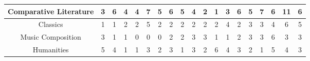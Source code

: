 \documentclass[10pt]{article}
\begin{document}
\begin{landscape}
\begin{longtable}[c]{|ccccccccccccccccccc|}
	\multicolumn{1}{|c|}{Comparative Literature}                     & \multicolumn{1}{c|}{3}          & \multicolumn{1}{c|}{6}          & \multicolumn{1}{c|}{4}          & \multicolumn{1}{c|}{4}          & \multicolumn{1}{c|}{7}          & \multicolumn{1}{c|}{5}          & \multicolumn{1}{c|}{6}          & \multicolumn{1}{c|}{5}          & \multicolumn{1}{c|}{4}          & \multicolumn{1}{c|}{2}          & \multicolumn{1}{c|}{1}          & \multicolumn{1}{c|}{3}          & \multicolumn{1}{c|}{6}          & \multicolumn{1}{c|}{5}          & \multicolumn{1}{c|}{7}          & \multicolumn{1}{c|}{6}          & \multicolumn{1}{c|}{11}         & 6          \\ \hline
	\multicolumn{1}{|c|}{Classics}                                   & \multicolumn{1}{c|}{1}          & \multicolumn{1}{c|}{1}          & \multicolumn{1}{c|}{2}          & \multicolumn{1}{c|}{2}          & \multicolumn{1}{c|}{5}          & \multicolumn{1}{c|}{2}          & \multicolumn{1}{c|}{2}          & \multicolumn{1}{c|}{2}          & \multicolumn{1}{c|}{2}          & \multicolumn{1}{c|}{2}          & \multicolumn{1}{c|}{2}          & \multicolumn{1}{c|}{4}          & \multicolumn{1}{c|}{2}          & \multicolumn{1}{c|}{3}          & \multicolumn{1}{c|}{3}          & \multicolumn{1}{c|}{4}          & \multicolumn{1}{c|}{6}          & 5          \\ \hline
	\multicolumn{1}{|c|}{Music Composition}                          & \multicolumn{1}{c|}{3}          & \multicolumn{1}{c|}{1}          & \multicolumn{1}{c|}{1}          & \multicolumn{1}{c|}{0}          & \multicolumn{1}{c|}{0}          & \multicolumn{1}{c|}{0}          & \multicolumn{1}{c|}{2}          & \multicolumn{1}{c|}{2}          & \multicolumn{1}{c|}{3}          & \multicolumn{1}{c|}{3}          & \multicolumn{1}{c|}{1}          & \multicolumn{1}{c|}{1}          & \multicolumn{1}{c|}{2}          & \multicolumn{1}{c|}{3}          & \multicolumn{1}{c|}{3}          & \multicolumn{1}{c|}{6}          & \multicolumn{1}{c|}{3}          & 3          \\ \hline
	\multicolumn{1}{|c|}{Humanities}                                 & \multicolumn{1}{c|}{5}          & \multicolumn{1}{c|}{4}          & \multicolumn{1}{c|}{1}          & \multicolumn{1}{c|}{1}          & \multicolumn{1}{c|}{3}          & \multicolumn{1}{c|}{2}          & \multicolumn{1}{c|}{3}          & \multicolumn{1}{c|}{1}          & \multicolumn{1}{c|}{3}          & \multicolumn{1}{c|}{2}          & \multicolumn{1}{c|}{6}          & \multicolumn{1}{c|}{4}          & \multicolumn{1}{c|}{3}          & \multicolumn{1}{c|}{2}          & \multicolumn{1}{c|}{1}          & \multicolumn{1}{c|}{5}          & \multicolumn{1}{c|}{4}          & 3          \\ \hline

\end{longtable}
\end{landscape}
\end{document}
